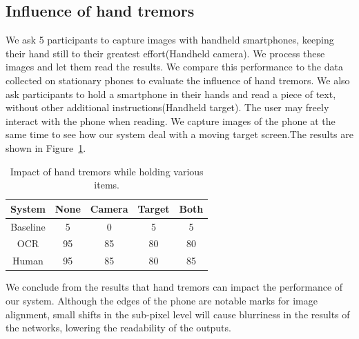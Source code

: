 
\subsection{Influence of hand tremors}
We ask 5 participants to capture images with handheld smartphones, keeping their hand still to their greatest effort(Handheld camera). We process these images and let them read the results. We compare this performance to the data collected on stationary phones to evaluate the influence of hand tremors.
We also ask participants to hold a smartphone in their hands and read a piece of text, without other additional instructions(Handheld target). The user may freely interact with the phone when reading. We capture images of the phone at the same time to see how our system deal with a moving target screen.The results are shown in Figure~\ref{table-tremor}.

\begin{table}[!t] 
    \centering
    \begin{tabular}{ccccc}
        \toprule
    System & None & Camera & Target & Both  \\
    \midrule
    Baseline & 5 & 0 & 5& 5\\ 
    \midrule
    OCR & 95 & 85 & 80 & 80\\ 
    Human & 95 & 85 & 80 & 85\\ \bottomrule
    \end{tabular}
    \caption{Impact of hand tremors while holding various items.}
    \label{table-tremor}
\end{table}


We conclude from the results that hand tremors can impact the performance of our system. Although the edges of the phone are notable marks for image alignment, small shifts in the sub-pixel level will cause blurriness in the results of the networks, lowering the readability of the outputs. 

